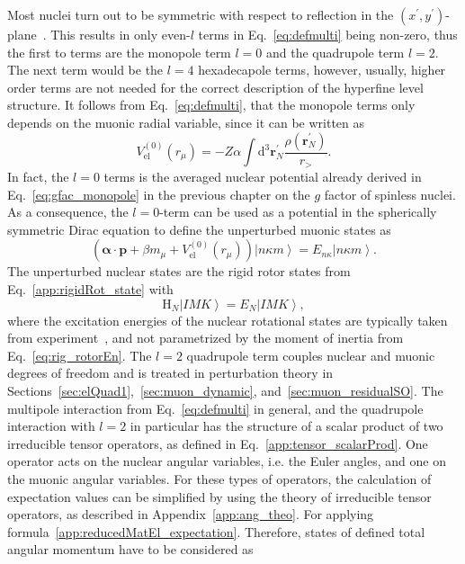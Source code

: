 Most nuclei turn out to be symmetric with respect to reflection in the $(x^\prime ,y^\prime)$-plane~\cite{zickendraht1991}. This results in only even-$l$ terms in Eq.~\eqref{eq:defmulti} being non-zero, thus the first to terms are the monopole term $l=0$ and the quadrupole term $l=2$. The next term would be the $l=4$ hexadecapole terms, however, usually, higher order terms are not needed for the correct description of the hyperfine level structure. It follows from Eq.~\eqref{eq:defmulti}, that the monopole terms only depends on the muonic radial variable, since it can be written as
\begin{equation}
V_{\text{el}}^{(0)}(r_\mu)=-Z\alpha \int\text{d}^3\mathbf{r}_N^\prime \frac{\rho(\mathbf{r}_N^\prime)}{r_>}.
\end{equation} 
In fact, the $l=0$ terms is the averaged nuclear potential already derived in Eq.~\eqref{eq:gfac_monopole} in the previous chapter on the $g$ factor of spinless nuclei. As a consequence, the $l=0$-term can be used as a potential in the spherically symmetric Dirac equation to define the unperturbed muonic states as
\begin{equation}
\label{eq:muonicEn}
\left(\boldsymbol{\alpha} \cdot \mathbf{p} + \beta m_\mu + V_{\text{el}}^{(0)}(r_\mu) \right) \left|n\kappa m\right> = E_{n\kappa}\left|n\kappa m\right>.
\end{equation}
The unperturbed nuclear states are the rigid rotor states from Eq.~\eqref{app:rigidRot_state} with
\begin{equation}
\label{eq:nuclEn}
\text{H}_N \left|IMK\right> = E_N \left|IMK\right>,
\end{equation}
where the excitation energies of the nuclear rotational states are typically taken from experiment~\cite{ENSDF}, and not parametrized by the moment of inertia from Eq.~\eqref{eq:rig_rotorEn}.
The $l=2$ quadrupole term couples nuclear and muonic degrees of freedom and is treated in perturbation theory in Sections~\ref{sec:elQuad1},~\ref{sec:muon_dynamic}, and~\ref{sec:muon_residualSO}. The multipole interaction from Eq.~\eqref{eq:defmulti} in general, and the quadrupole interaction with $l=2$ in particular has the structure of a scalar product of two irreducible tensor operators, as defined in Eq.~\eqref{app:tensor_scalarProd}. One operator acts on the nuclear angular variables, i.e. the Euler angles, and one on the muonic angular variables.
For these types of operators, the calculation of expectation values can be simplified by using the theory of irreducible tensor operators, as described in Appendix~\ref{app:ang_theo}. For applying formula~\eqref{app:reducedMatEl_expectation}. Therefore, states of defined total angular momentum have to be considered as
